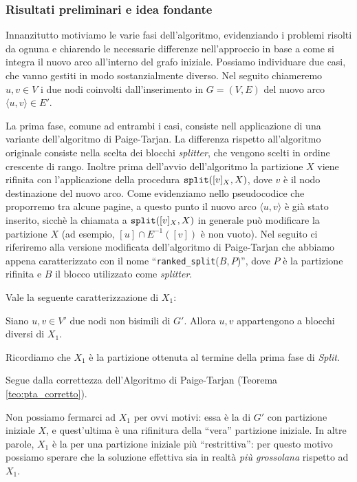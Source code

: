 \subsubsection{Risultati preliminari e idea fondante}
Innanzitutto motiviamo le varie fasi dell'algoritmo, evidenziando i problemi risolti da ognuna e chiarendo le necessarie differenze nell'approccio in base a come si integra il nuovo arco all'interno del grafo iniziale. Possiamo individuare due casi, che vanno gestiti in modo sostanzialmente diverso. Nel seguito chiameremo $u,v \in V$ i due nodi coinvolti dall'inserimento in $G = (V,E)$ del nuovo arco $\langle u,v \rangle \in E'$.

La prima fase, comune ad entrambi i casi, consiste nell applicazione di una variante dell'algoritmo di Paige-Tarjan. La differenza rispetto all'algoritmo originale consiste nella scelta dei blocchi \emph{splitter}, che vengono scelti in ordine crescente di rango. Inoltre prima dell'avvio dell'algoritmo la partizione $X$ viene rifinita con l'applicazione della procedura $\texttt{\textup{split}}([v]_X, X)$, dove $v$ è il nodo destinazione del nuovo arco. Come evidenziamo nello pseudocodice che proporremo tra alcune pagine, a questo punto il nuovo arco $\langle u,v \rangle$ è già stato inserito, sicchè la chiamata a $\texttt{\textup{split}}([v]_X, X)$ in generale può modificare la partizione $X$ (ad esempio, $[u] \cap E^{-1}([v])$ è non vuoto). Nel seguito ci riferiremo alla versione modificata dell'algoritmo di Paige-Tarjan che abbiamo appena caratterizzato con il nome ``\texttt{ranked\_split}($B,P$)'', dove $P$ è la partizione rifinita e $B$ il blocco utilizzato come \emph{splitter}.

Vale la seguente caratterizzazione di $X_1$:
\begin{proposition}
    \label{prop:x1_prop}
    Siano $u,v \in V'$ due nodi non bisimili di $G'$. Allora $u,v$ appartengono a blocchi diversi di $X_1$.
\end{proposition}
Ricordiamo che $X_1$ è la partizione ottenuta al termine della prima fase di \emph{Split}.
\begin{proof2}
    Segue dalla correttezza dell'Algoritmo di Paige-Tarjan (Teorema \ref{teo:pta_corretto}).
\end{proof2}

Non possiamo fermarci ad $X_1$ per ovvi motivi: essa è la \rscp di $G'$ con partizione iniziale $X$, e quest'ultima è una rifinitura della ``vera'' partizione iniziale. In altre parole, $X_1$ è la \rscp per una partizione iniziale più ``restrittiva'': per questo motivo possiamo sperare che la soluzione effettiva sia in realtà \emph{più grossolana} rispetto ad $X_1$.

